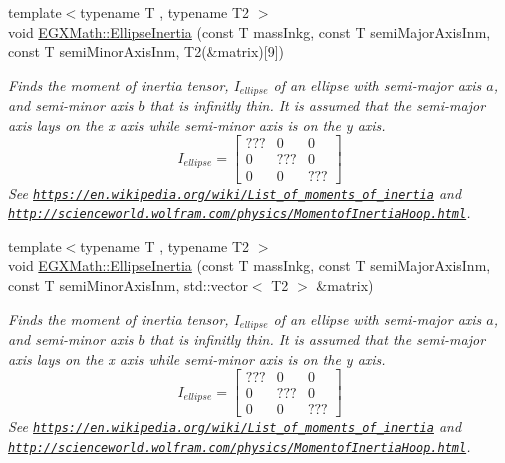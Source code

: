 \begin{DoxyCompactItemize}
\item 
{\footnotesize template$<$typename T , typename T2 $>$ }\\void \mbox{\hyperlink{group___e_g_x_math-_geometry-2_d-_ellipse-_inertia_ga10a3049c2f04b50f271fb01dc62e4cf8}{E\+G\+X\+Math\+::\+Ellipse\+Inertia}} (const T mass\+Inkg, const T semi\+Major\+Axis\+Inm, const T semi\+Minor\+Axis\+Inm, T2(\&matrix)\mbox{[}9\mbox{]})
\begin{DoxyCompactList}\small\item\em Finds the moment of inertia tensor, $I_{ellipse}$ of an ellipse with semi-\/major axis $a$, and semi-\/minor axis $b$ that is infinitly thin. It is assumed that the semi-\/major axis lays on the x axis while semi-\/minor axis is on the y axis. \[ I_{ellipse}=\begin{bmatrix} ??? & 0 & 0\\ 0 & ??? & 0\\ 0 & 0 & ??? \end{bmatrix} \] See \href{https://en.wikipedia.org/wiki/List_of_moments_of_inertia}{\tt https\+://en.\+wikipedia.\+org/wiki/\+List\+\_\+of\+\_\+moments\+\_\+of\+\_\+inertia} and \href{http://scienceworld.wolfram.com/physics/MomentofInertiaHoop.html}{\tt http\+://scienceworld.\+wolfram.\+com/physics/\+Momentof\+Inertia\+Hoop.\+html}. \end{DoxyCompactList}\item 
{\footnotesize template$<$typename T , typename T2 $>$ }\\void \mbox{\hyperlink{group___e_g_x_math-_geometry-2_d-_ellipse-_inertia_ga4d9a8fec47d22c25481db36bf475905a}{E\+G\+X\+Math\+::\+Ellipse\+Inertia}} (const T mass\+Inkg, const T semi\+Major\+Axis\+Inm, const T semi\+Minor\+Axis\+Inm, std\+::vector$<$ T2 $>$ \&matrix)
\begin{DoxyCompactList}\small\item\em Finds the moment of inertia tensor, $I_{ellipse}$ of an ellipse with semi-\/major axis $a$, and semi-\/minor axis $b$ that is infinitly thin. It is assumed that the semi-\/major axis lays on the x axis while semi-\/minor axis is on the y axis. \[ I_{ellipse}=\begin{bmatrix} ??? & 0 & 0\\ 0 & ??? & 0\\ 0 & 0 & ??? \end{bmatrix} \] See \href{https://en.wikipedia.org/wiki/List_of_moments_of_inertia}{\tt https\+://en.\+wikipedia.\+org/wiki/\+List\+\_\+of\+\_\+moments\+\_\+of\+\_\+inertia} and \href{http://scienceworld.wolfram.com/physics/MomentofInertiaHoop.html}{\tt http\+://scienceworld.\+wolfram.\+com/physics/\+Momentof\+Inertia\+Hoop.\+html}. \end{DoxyCompactList}\item 

\end{DoxyCompactItemize}
